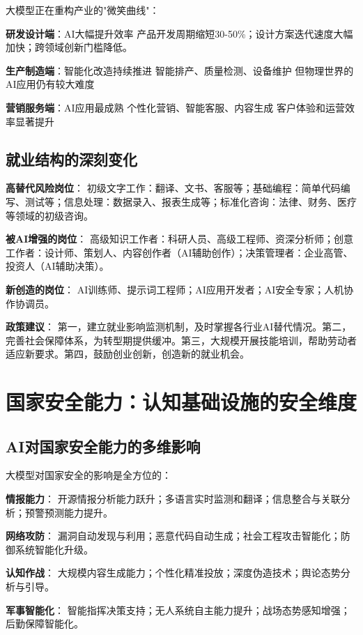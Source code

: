 大模型正在重构产业的"微笑曲线"：

\textbf{研发设计端}：AI大幅提升效率
产品开发周期缩短30-50\%；设计方案迭代速度大幅加快；跨领域创新门槛降低。

\textbf{生产制造端}：智能化改造持续推进
智能排产、质量检测、设备维护 但物理世界的AI应用仍有较大难度

\textbf{营销服务端}：AI应用最成熟
个性化营销、智能客服、内容生成 客户体验和运营效率显著提升

\subsection{就业结构的深刻变化}

\textbf{高替代风险岗位}：
初级文字工作：翻译、文书、客服等；基础编程：简单代码编写、测试等；信息处理：数据录入、报表生成等；标准化咨询：法律、财务、医疗等领域的初级咨询。

\textbf{被AI增强的岗位}：
高级知识工作者：科研人员、高级工程师、资深分析师；创意工作者：设计师、策划人、内容创作者（AI辅助创作）；决策管理者：企业高管、投资人（AI辅助决策）。

\textbf{新创造的岗位}：
AI训练师、提示词工程师；AI应用开发者；AI安全专家；人机协作协调员。

\textbf{政策建议}：
第一，建立就业影响监测机制，及时掌握各行业AI替代情况。第二，完善社会保障体系，为转型期提供缓冲。第三，大规模开展技能培训，帮助劳动者适应新要求。第四，鼓励创业创新，创造新的就业机会。

\section{国家安全能力：认知基础设施的安全维度}

\subsection{AI对国家安全能力的多维影响}

大模型对国家安全的影响是全方位的：

\textbf{情报能力}：
开源情报分析能力跃升；多语言实时监测和翻译；信息整合与关联分析；预警预测能力提升。

\textbf{网络攻防}：
漏洞自动发现与利用；恶意代码自动生成；社会工程攻击智能化；防御系统智能化升级。

\textbf{认知作战}：
大规模内容生成能力；个性化精准投放；深度伪造技术；舆论态势分析与引导。

\textbf{军事智能化}：
智能指挥决策支持；无人系统自主能力提升；战场态势感知增强；后勤保障智能化。

